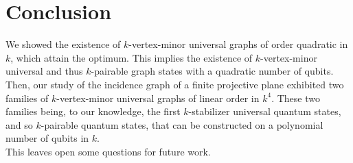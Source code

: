 \documentclass[10pt,a4paper]{article}
\begin{document}
\section{Conclusion}

We showed the existence of $k$-vertex-minor universal graphs of order quadratic in $k$, which attain the optimum. This implies the existence of $k$-vertex-minor universal and thus $k$-pairable graph states with a quadratic number of qubits. Then, our study of the incidence graph of a finite projective plane exhibited two families of $k$-vertex-minor universal graphs of linear order in $k^4$. These two families being, to our knowledge, the first $k$-stabilizer universal quantum states, and so $k$-pairable quantum states, that can be constructed on a polynomial number of qubits in $k$.\\
This leaves open some questions for future work.
\end{document}
